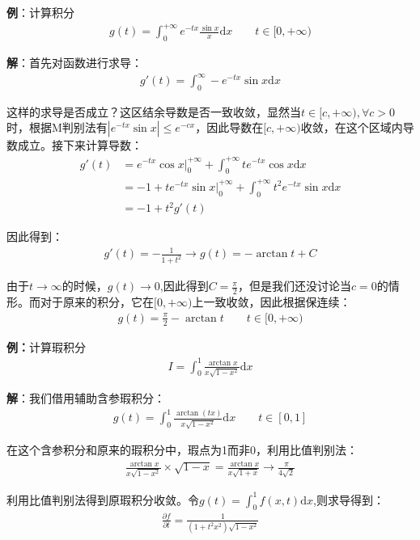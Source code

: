 \documentclass{ctexart}
\let\oldtextbf\textbf
\renewcommand{\textbf}[1]{\textcolor{brown!50!red}{\oldtextbf{#1}}}
\begin{document}
\textbf{\color{brown!50!red}例}：计算积分
\begin{align*}
    g(t)=\int_0^{+\infty}e^{-tx}\frac{\sin x}{x}\mathrm{d}x\qquad t\in[0,+\infty)
\end{align*}

\textbf{\color{brown!50!red}解}：首先对函数进行求导：
\begin{align*}
    g'(t)=\int_0^{\infty}-e^{-tx}\sin x\mathrm{d}x
\end{align*}

这样的求导是否成立？这区结余导数是否一致收敛，显然当$t\in[c,+\infty),\forall c>0$时，根据M判别法有$|e^{-tx}\sin x|\leq e^{-cx}$，因此导数在$[c,+\infty)$收敛，在这个区域内导数成立。接下来计算导数：
\begin{align*}
    g'(t)&=e^{-tx}\cos x|_0^{+\infty}+\int_0^{+\infty}te^{-tx}\cos x\mathrm{d}x\\
    &=-1+te^{-tx}\sin x|_0^{+\infty}+\int_0^{+\infty}t^2 e^{-tx}\sin x\mathrm{d}x\\
    &=-1+t^2g'(t)
\end{align*}

因此得到：
\begin{align*}
    g'(t)=-\frac{1}{1+t^2}\to g(t)=-\arctan t+C
\end{align*}

由于$t\to\infty$的时候，$g(t)\to 0$,因此得到$C=\frac{\pi}{2}$，但是我们还没讨论当$c=0$的情形。而对于原来的积分，它在$[0,+\infty)$上一致收敛，因此根据保连续：
\begin{align*}
    g(t)=\frac{\pi}{2}-\arctan t\qquad t\in[0,+\infty)
\end{align*}

\textbf{\color{brown!50!red}例：}计算瑕积分
\begin{align*}
    I=\int_0^1\frac{\arctan x}{x\sqrt{1-x^2}}\mathrm{d}x
\end{align*}

\textbf{\color{brown!50!red}解}：我们借用辅助含参瑕积分：
\begin{align*}
    g(t)=\int_0^1\frac{\arctan(tx)}{x\sqrt{1-x^2}}\mathrm{d}x\qquad t\in[0,1]
\end{align*}

在这个含参积分和原来的瑕积分中，瑕点为1而非0，利用比值判别法：
\begin{align*}
    \frac{\arctan x}{x\sqrt{1-x^2}}\times\sqrt{1-x}=\frac{\arctan x}{x\sqrt{1+x}}\to\frac{\pi}{4\sqrt{2}}
\end{align*}

利用比值判别法得到原瑕积分收敛。令$g(t)=\int_0^1 f(x,t)\mathrm{d}x$,则求导得到：
\begin{align*}
    \frac{\partial f}{\partial t}=\frac{1}{(1+t^2x^2)\sqrt{1-x^2}}
\end{align*}
\end{document}
